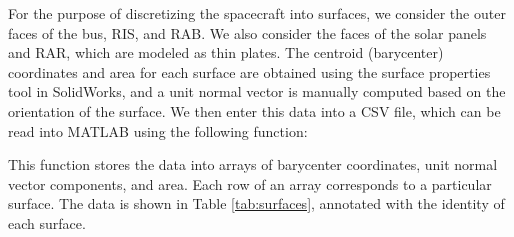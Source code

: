 For the purpose of discretizing the spacecraft into surfaces, we consider the outer faces of the bus, RIS, and RAB. We also consider the faces of the solar panels and RAR, which are modeled as thin plates. The centroid (barycenter) coordinates and area for each surface are obtained using the surface properties tool in SolidWorks, and a unit normal vector is manually computed based on the orientation of the surface. We then enter this data into a CSV file, which can be read into MATLAB using the following function:



This function stores the data into arrays of barycenter coordinates, unit normal vector components, and area. Each row of an array corresponds to a particular surface. The data is shown in Table \ref{tab:surfaces}, annotated with the identity of each surface.

